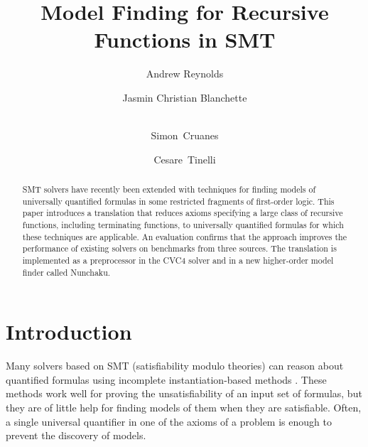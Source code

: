 \title{Model Finding for Recursive Functions in SMT}

\author {Andrew Reynolds \and Jasmin Christian Blanchette \and \\ Simon~Cruanes \and Cesare~Tinelli }

\maketitle

\setcounter{footnote}{0}

\begin{abstract}
\noindent
SMT solvers have recently been extended with techniques for finding models
of universally quantified formulas in some restricted fragments
of first-order logic.
This paper introduces a translation that reduces axioms specifying a large
class of recursive functions, including terminating functions,
to universally quantified formulas for which these
techniques are applicable.
An evaluation confirms that the approach improves
the performance of existing solvers on benchmarks from three sources.
The translation is implemented as a preprocessor in the CVC4 solver
and in a new higher-order model finder called Nunchaku.
\end{abstract}

\section{Introduction}
\label{sec:introduction}

Many solvers based on SMT (satisfiability modulo theories) can reason about
quantified formulas using incomplete instantiation-based methods
\cite{MouraBjoerner07,ReynoldsTinelliMoura14}.
These methods work well for proving the
unsatisfiability of an input set of formulas, 
but they are of little help for finding models of them
when they are satisfiable. Often, a single universal quantifier in one of the
axioms of a problem is enough to prevent the discovery of models.

